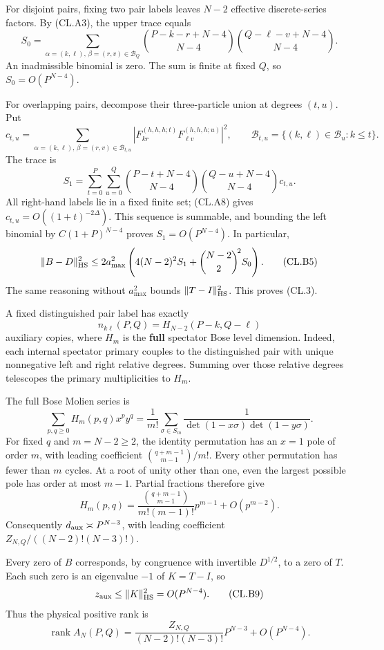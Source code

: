 \documentclass[a4paper,11pt]{article}
\numberwithin{equation}{section}
\begin{document}
For disjoint pairs, fixing two pair labels leaves \(N-2\) effective discrete-series factors. By (CL.A3), the upper trace equals \[
S_0=\sum_{\alpha=(k,\ell),\,\beta=(r,v)\in\mathcal B_Q}
\binom{P-k-r+N-4}{N-4}
\binom{Q-\ell-v+N-4}{N-4}.
\tag{CL.B3}
\] An inadmissible binomial is zero. The sum is finite at fixed \(Q\), so \(S_0=O(P^{N-4})\).

For overlapping pairs, decompose their three-particle union at degrees \((t,u)\). Put \[
c_{t,u}=\sum_{\alpha=(k,\ell),\,\beta=(r,v)\in\mathcal B_{t,u}}
|F_{kr}^{(h,h,h;t)}F_{\ell v}^{(h,h,h;u)}|^2,\qquad
\mathcal B_{t,u}=\{(k,\ell)\in\mathcal B_u:k\leq t\}.
\] The trace is \[
S_1=\sum_{t=0}^P\sum_{u=0}^Q
\binom{P-t+N-4}{N-4}
\binom{Q-u+N-4}{N-4}c_{t,u}.
\tag{CL.B4}
\] All right-hand labels lie in a fixed finite set; (CL.A8) gives \(c_{t,u}=O((1+t)^{-2\Delta})\). This sequence is summable, and bounding the left binomial by \(C(1+P)^{N-4}\) proves \(S_1=O(P^{N-4})\). In particular, \[
\|B-D\|_{\rm HS}^2
\leq2a_{\max}^2
\left(4(N-2)^2S_1+\binom{N-2}{2}^{\!2}S_0\right).
\tag{CL.B5}
\] The same reasoning without \(a_{\max}^2\) bounds \(\|T-I\|_{\rm HS}^2\). This proves (CL.3).

A fixed distinguished pair label has exactly \[
n_{k\ell}(P,Q)=H_{N-2}(P-k,Q-\ell)
\tag{CL.B6}
\] auxiliary copies, where \(H_m\) is the \textbf{full} spectator Bose level dimension. Indeed, each internal spectator primary couples to the distinguished pair with unique nonnegative left and right relative degrees. Summing over those relative degrees telescopes the primary multiplicities to \(H_m\).

The full Bose Molien series is \[
\sum_{p,q\geq0}H_m(p,q)x^py^q
=\frac1{m!}\sum_{\sigma\in S_m}
\frac1{\det(1-x\sigma)\det(1-y\sigma)}.
\tag{CL.B7}
\] For fixed \(q\) and \(m=N-2\geq2\), the identity permutation has an \(x=1\) pole of order \(m\), with leading coefficient \(\binom{q+m-1}{m-1}/m!\). Every other permutation has fewer than \(m\) cycles. At a root of unity other than one, even the largest possible pole has order at most \(m-1\). Partial fractions therefore give \[
H_m(p,q)=
\frac{\binom{q+m-1}{m-1}}{m!(m-1)!}p^{m-1}
+O(p^{m-2}).
\tag{CL.B8}
\] Consequently \(d_{\rm aux}\asymp P^{N-3}\), with leading coefficient \(Z_{N,Q}/((N-2)!(N-3)!)\).

Every zero of \(B\) corresponds, by congruence with invertible \(D^{1/2}\), to a zero of \(T\). Each such zero is an eigenvalue \(-1\) of \(K=T-I\), so \[
z_{\rm aux}\leq\|K\|_{\rm HS}^2=O(P^{N-4}).
\tag{CL.B9}
\] Thus the physical positive rank is \[
\operatorname{rank}A_N(P,Q)
=\frac{Z_{N,Q}}{(N-2)!(N-3)!}P^{N-3}+O(P^{N-4}).
\tag{CL.B10}
\]
\end{document}

